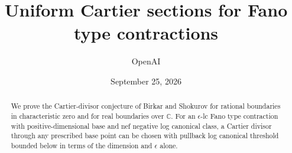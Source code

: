 \documentclass[11pt]{article}
\title{Uniform Cartier sections for Fano type contractions}
\author{OpenAI}
\date{September 25, 2026}
\numberwithin{equation}{section}
\theoremstyle{definition}
\theoremstyle{remark}
\newcommand{\C}{\mathbb C}
\begin{document}
\maketitle
\begin{abstract}
We prove the Cartier-divisor conjecture of Birkar and Shokurov for rational boundaries in characteristic zero and for real boundaries over $\C$. For an $\epsilon$-lc Fano type contraction with positive-dimensional base and nef negative log canonical class, a Cartier divisor through any prescribed base point can be chosen with pullback log canonical threshold bounded below in terms of the dimension and $\epsilon$ alone.
\end{abstract}

\clearpage
\begingroup
\small
\tableofcontents
\endgroup
\clearpage








\begingroup
\small


\endgroup
\end{document}
